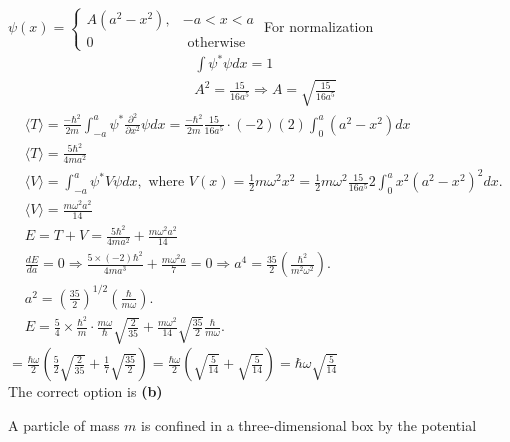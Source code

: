 \begin{enumerate}
\begin{answer}
	$\psi(x)= \begin{cases}A\left(a^{2}-x^{2}\right), & -a<x<a \\ 0 & \text { otherwise }\end{cases}$ For normalization
	$$
	\begin{aligned}
	&\int \psi^{*} \psi d x=1 \\
	&A^{2}=\frac{15}{16 a^{5}} \Rightarrow A=\sqrt{\frac{15}{16 a^{5}}}
	\end{aligned}
	$$
	$\begin{aligned}
	&\langle T\rangle=\frac{-\hbar^{2}}{2 m} \int_{-a}^{a} \psi^{*} \frac{\partial^{2}}{\partial x^{2}} \psi d x=\frac{-\hbar^{2}}{2 m} \frac{15}{16 a^{5}} \cdot(-2)(2) \int_{0}^{a}\left(a^{2}-x^{2}\right) d x \\
	&\langle T\rangle=\frac{5 \hbar^{2}}{4 m a^{2}} \\
	&\langle V\rangle=\int_{-a}^{a} \psi^{*} V \psi d x, \text { where } V(x)=\frac{1}{2} m \omega^{2} x^{2}=\frac{1}{2} m \omega^{2} \frac{15}{16 a^{5}} 2 \int_{0}^{a} x^{2}\left(a^{2}-x^{2}\right)^{2} d x . \\
	&\langle V\rangle=\frac{m \omega^{2} a^{2}}{14}
	\end{aligned}$\\
	$\begin{aligned}
	&E=T+V=\frac{5 \hbar^{2}}{4 m a^{2}}+\frac{m \omega^{2} a^{2}}{14} \\
	&\frac{d E}{d a}=0 \Rightarrow \frac{5 \times(-2) \hbar^{2}}{4 m a^{3}}+\frac{m \omega^{2} a}{7}=0 \Rightarrow a^{4}=\frac{35}{2}\left(\frac{\hbar^{2}}{m^{2} \omega^{2}}\right) . \\
	&a^{2}=\left(\frac{35}{2}\right)^{1 / 2}\left(\frac{\hbar}{m \omega}\right) . \\
	&E=\frac{5}{4} \times \frac{\hbar^{2}}{m} \cdot \frac{m \omega}{\hbar} \sqrt{\frac{2}{35}}+\frac{m \omega^{2}}{14} \sqrt{\frac{35}{2}} \frac{\hbar}{m \omega} .
	\end{aligned}$\\
	$=\frac{\hbar \omega}{2}\left(\frac{5}{2} \sqrt{\frac{2}{35}}+\frac{1}{7} \sqrt{\frac{35}{2}}\right)=\frac{\hbar \omega}{2}\left(\sqrt{\frac{5}{14}}+\sqrt{\frac{5}{14}}\right)=\hbar \omega \sqrt{\frac{5}{14}}$\\
	The correct option is \textbf{(b)}	
\end{answer}
\begin{minipage}{\textwidth}
	\item A particle of mass $m$ is confined in a three-dimensional box by the potential

\end{minipage}
\end{enumerate}
